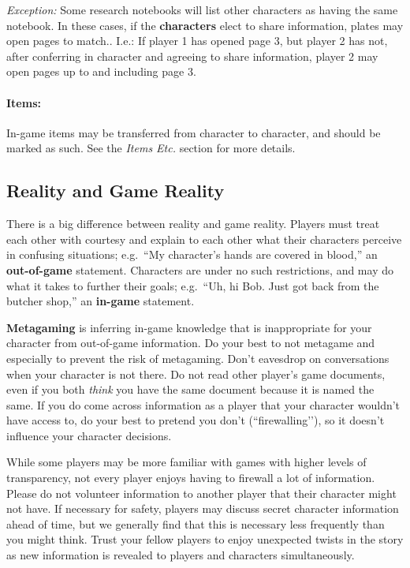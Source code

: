\documentclass[sheet]{GL2020}
\begin{document}
\emph{Exception:} Some research notebooks will list other characters as having the same notebook. In these cases, if the \textbf{characters} elect to share information, plates may open pages to match.. I.e.: If player 1 has opened page 3, but player 2 has not, after conferring in character and agreeing to share information, player 2 may open pages up to and including page 3.

\paragraph{Items:} In-game items may be transferred from character to character, and should be marked as such.  See the \emph{Items Etc.} section for more details.


\clearpage
\subsection{Reality and Game Reality}

There is a big difference between reality and game reality.  Players must treat each other with courtesy and explain to each other what their characters perceive in confusing situations; e.g.\ ``My character's hands are covered in blood,'' an {\bf out-of-game} statement.  Characters are under no such restrictions, and may do what it takes to further their goals; e.g.\ ``Uh, hi Bob. Just got back from the butcher shop,'' an {\bf in-game} statement.

{\bf Metagaming} is inferring in-game knowledge that is inappropriate for your character from out-of-game information. Do your best to not metagame and especially to prevent the risk of metagaming. Don’t eavesdrop on conversations when your character is not there. Do not read other player’s game documents, even if you both \emph{think} you have the same document because it is named the same. If you do come across information as a player that your character wouldn’t have access to, do your best to pretend you don’t (``firewalling’’), so it doesn’t influence your character decisions.

While some players may be more familiar with games with higher levels of transparency, not every player enjoys having to firewall a lot of information. Please do not volunteer information to another player that their character might not have. If necessary for safety, players may discuss secret character information ahead of time, but we generally find that this is necessary less frequently than you might think. Trust your fellow players to enjoy unexpected twists in the story as new information is revealed to players and characters simultaneously.
\end{document}
